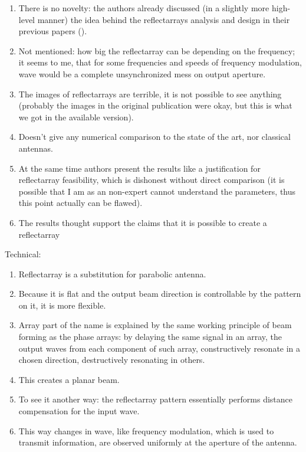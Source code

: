 \documentclass{article}
\begin{document}
\begin{enumerate}
        \item There is no novelty: the authors already discussed (in a slightly more high-level manner) the idea behind the reflectarrays analysis and design in their previous papers (\cite{targonski.pozar_1994jun,pozar.metzler_1993apr}).
        \item Not mentioned: how big the reflectarray can be depending on the frequency; it seems to me, that for some frequencies and speeds of frequency modulation, wave would be a complete unsynchronized mess on output aperture.
        \item The images of reflectarrays are terrible, it is not possible to see anything (probably the images in the original publication were okay, but this is what we got in the available version).
        \item Doesn't give any numerical comparison to the state of the art, nor classical antennas.
        \item At the same time authors present the results like a justification for reflectarray feasibility, which is dishonest without direct comparison (it is possible that I am as an non-expert cannot understand the parameters, thus this point actually can be flawed).
        \item The results thought support the claims that it is possible to create a reflectarray
    \end{enumerate}

    Technical:
    \begin{enumerate}
        \item Reflectarray is a substitution for parabolic antenna.
        \item Because it is flat and the output beam direction is controllable by the pattern on it, it is more flexible.
        \item Array part of the name is explained by the same working principle of beam forming as the phase arrays: by delaying the same signal in an array, the output waves from each component of such array, constructively resonate in a chosen direction, destructively resonating in others.
        \item This creates a planar beam.
        \item To see it another way: the reflectarray pattern essentially performs distance compensation for the input wave.
        \item This way changes in wave, like frequency modulation, which is used to transmit information, are observed uniformly at the aperture of the antenna.
    \end{enumerate}
    
    
\end{document}
